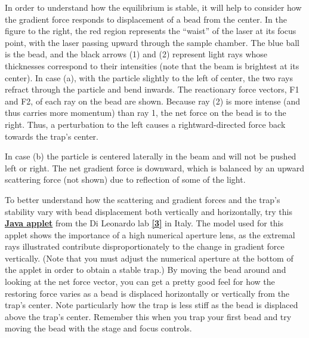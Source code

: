 \documentclass{../lab}
\begin{document}
In order to understand how the equilibrium is stable, it will help to consider how the gradient force responds to displacement of a bead from the center. In the figure to the right, the red region represents the ``waist'' of the laser at its focus point, with the laser passing upward through the sample chamber. The blue ball is the bead, and the black arrows (1) and (2) represent light rays whose thicknesses correspond to their intensities (note that the beam is brightest at its center). In case (a), with the particle slightly to the left of center, the two rays refract through the particle and bend inwards. The reactionary force vectors, F1 and F2, of each ray on the bead are shown. Because ray (2) is more intense (and thus carries more momentum) than ray 1, the net force on the bead is to the right. Thus, a perturbation to the left causes a rightward-directed force back towards the trap's center.

In case (b) the particle is centered laterally in the beam and will not be pushed left or right. The net gradient force is downward, which is balanced by an upward scattering force (not shown) due to reflection of some of the light.

To better understand how the scattering and gradient forces and the trap's stability vary with bead displacement both vertically and horizontally, try this \href{http://glass.phys.uniroma1.it/dileonardo/Applet.php?applet=TrapForcesApplet}{\textbf{Java applet}} from the Di Leonardo lab \href{http://glass.phys.uniroma1.it/dileonardo/Applet.php?applet=TrapForcesApplet}{\textbf{[3]}} in Italy. The model used for this applet shows the importance of a high numerical aperture lens, as the extremal rays illustrated contribute disproportionately to the change in gradient force vertically. (Note that you must adjust the numerical aperture at the bottom of the applet in order to obtain a stable trap.) By moving the bead around and looking at the net force vector, you can get a pretty good feel for how the restoring force varies as a bead is displaced horizontally or vertically from the trap's center. Note particularly how the trap is less stiff as the bead is displaced above the trap's center. Remember this when you trap your first bead and try moving the bead with the stage and focus controls.
\end{document}
